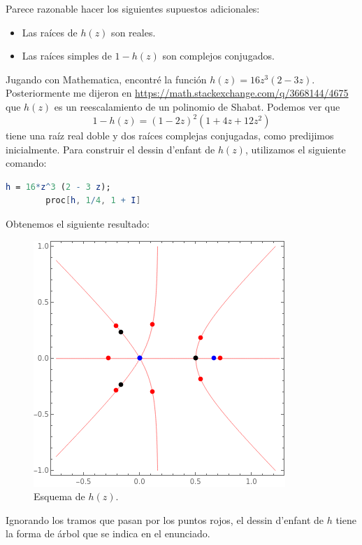 \begin{solution}
\begin{itemize}
\begin{itemize}
        Parece razonable hacer los siguientes supuestos adicionales:
        \begin{itemize}
            \item Las raíces de $h(z)$ son reales.
            \item Las raíces simples de $1 - h(z)$ son complejos conjugados.
        \end{itemize}
        
        Jugando con Mathematica, encontré la función $h(z) = 16 z^3 (2 - 3z)$. Posteriormente me dijeron en \url{https://math.stackexchange.com/q/3668144/4675} que $h(z)$ es un reescalamiento de un polinomio de Shabat. Podemos ver que
        $$1 - h(z) = (1 - 2z)^2 (1 + 4z + 12z^2)$$
        tiene una raíz real doble y dos raíces complejas conjugadas, como predijimos inicialmente. Para construir el dessin d'enfant de $h(z)$, utilizamos el siguiente comando:
        \begin{lstlisting}[language=Mathematica]
        h = 16*z^3 (2 - 3 z);
        proc[h, 1/4, 1 + I]
        \end{lstlisting}
        
        Obtenemos el siguiente resultado:
        \begin{figure}[h]
            \centering
            \includegraphics[scale=0.4]{dessins/h.png}
            \caption{Esquema de $h(z)$.}
        \end{figure}
        
        Ignorando los tramos que pasan por los puntos rojos, el dessin d'enfant de $h$ tiene la forma de árbol que se indica en el enunciado.
        

\end{itemize}
\end{itemize}
\end{solution}
